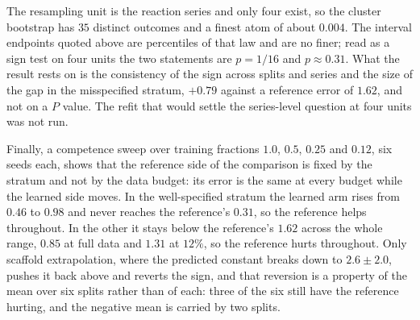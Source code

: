 The resampling unit is the reaction series and only four exist, so the cluster bootstrap has $35$
distinct outcomes and a finest atom of about $0.004$. The interval endpoints quoted above are
percentiles of that law and are no finer; read as a sign test on four units the two statements are
$p=1/16$ and $p\approx0.31$. What the result rests on is the consistency of the sign across splits
and series and the size of the gap in the misspecified stratum, $+0.79$ against a reference error
of $1.62$, and not on a $P$ value. The refit that would settle the series-level question at four
units was not run.

Finally, a competence sweep over training fractions $1.0$, $0.5$, $0.25$ and $0.12$, six seeds
each, shows that the reference side of the comparison is fixed by the stratum and not by the data
budget: its error is the same at every budget while the learned side moves. In the well-specified
stratum the learned arm rises from $0.46$ to $0.98$ and never reaches the reference's $0.31$, so
the reference helps throughout. In the other it stays below the reference's $1.62$ across the whole
range, $0.85$ at full data and $1.31$ at $12\%$, so the reference hurts throughout. Only scaffold
extrapolation, where the predicted constant breaks down to $2.6\pm2.0$, pushes it back above and
reverts the sign, and that reversion is a property of the mean over six splits rather than of each:
three of the six still have the reference hurting, and the negative mean is carried by two splits.
